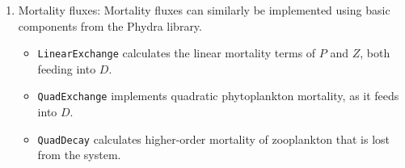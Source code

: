 \documentclass[journal abbreviation, manuscript]{copernicus}
\begin{document}
\begin{enumerate}
    \item Mortality fluxes: Mortality fluxes can similarly be implemented using basic components from the Phydra library.
    \begin{itemize}
        \item \texttt{LinearExchange} calculates the linear mortality terms of $P$ and $Z$, both feeding into $D$. 
        \item \texttt{QuadExchange} implements quadratic phytoplankton mortality, as it feeds into $D$. 
        \item \texttt{QuadDecay} calculates higher-order mortality of zooplankton that is lost from the system.
    \end{itemize}
\end{enumerate}
\end{document}
